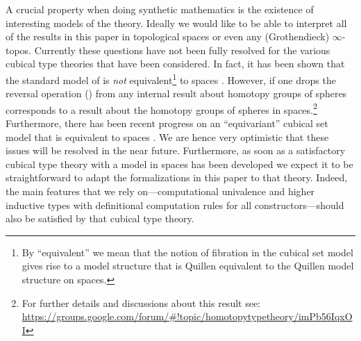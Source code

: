 A crucial property when doing synthetic mathematics is the existence
of interesting models of the theory. Ideally we would like to be able
to interpret all of the results in this paper in topological spaces or
even any (Grothendieck) $\infty$-topos. Currently these questions have
not been fully resolved for the various cubical type theories that
have been considered. In fact, it has been shown that the standard
model of \CubicalAgda is \emph{not} equivalent\footnote{By
  ``equivalent'' we mean that the notion of fibration in the cubical
  set model gives rise to a model structure that is Quillen equivalent
  to the Quillen model structure on spaces.} to spaces
. However, if one drops the reversal operation
() from \CubicalAgda any internal result about homotopy
groups of spheres corresponds to a result about the homotopy groups of
spheres in spaces.\footnote{For further details and discussions about
  this result see:
  \url{https://groups.google.com/forum/\#!topic/homotopytypetheory/imPb56IqxOI}}
Furthermore, there has been recent progress on an ``equivariant''
cubical set model that is equivalent to spaces .  We
are hence very optimistic that these issues will be resolved in the
near future. Furthermore, as soon as a satisfactory cubical type
theory with a model in spaces has been developed we expect it to be
straightforward to adapt the formalizations in this paper to that
theory. Indeed, the main features that we rely on---computational
univalence and higher inductive types with definitional computation
rules for all constructors---should also be satisfied by that cubical
type theory.